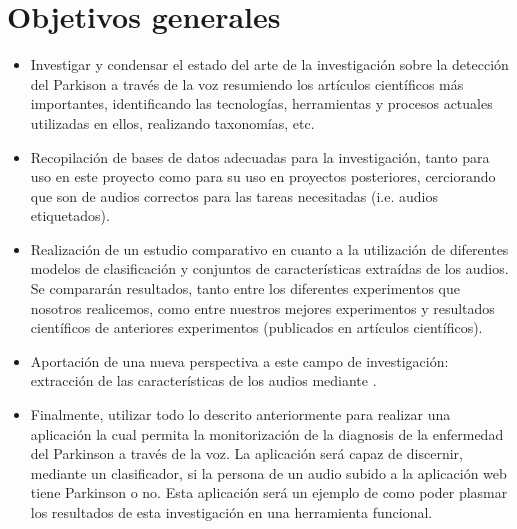 
\section{Objetivos generales}
\begin{itemize}
	\item Investigar y condensar el estado del arte de la investigación sobre la detección del Parkison a través de la voz resumiendo los artículos científicos más importantes, identificando las tecnologías, herramientas y procesos actuales utilizadas en ellos, realizando taxonomías, etc.
	\item Recopilación de bases de datos adecuadas para la investigación, tanto para uso en este proyecto como para su uso en proyectos posteriores, cerciorando que son  de audios correctos para las tareas necesitadas (i.e. audios etiquetados).
	\item Realización de un estudio comparativo en cuanto a la utilización de diferentes modelos de clasificación y conjuntos de características extraídas de los audios. Se compararán resultados, tanto entre los diferentes experimentos que nosotros realicemos, como entre nuestros mejores experimentos y resultados científicos de anteriores experimentos (publicados en artículos científicos).
	\item Aportación de una nueva perspectiva a este campo de investigación: extracción de las características de los audios mediante .
	\item Finalmente, utilizar todo lo descrito anteriormente para realizar una aplicación la cual permita la monitorización de la diagnosis de la enfermedad del Parkinson a través de la voz. La aplicación será capaz de discernir, mediante un clasificador, si la persona de un audio subido a la aplicación web tiene Parkinson o no. Esta aplicación será un ejemplo de como poder plasmar los resultados de esta investigación en una herramienta funcional.
\end{itemize}

